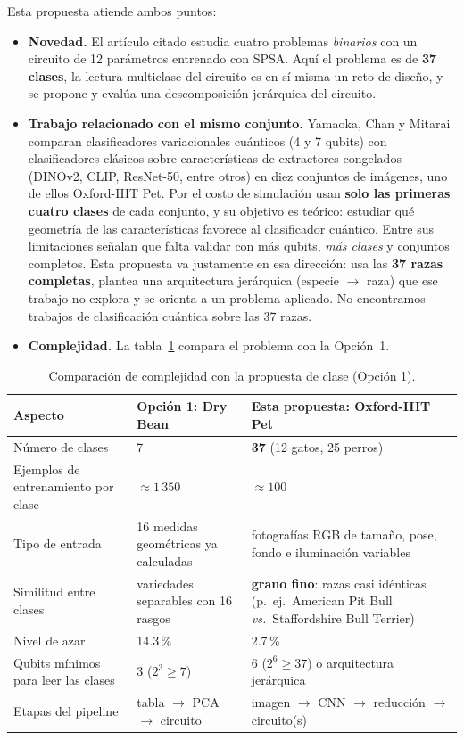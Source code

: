 \documentclass[11pt,letterpaper]{article}
\begin{document}
Esta propuesta atiende ambos puntos:
\begin{itemize}[leftmargin=*]
\item \textbf{Novedad.} El artículo citado estudia cuatro problemas \emph{binarios} con un circuito de
12 parámetros entrenado con SPSA. Aquí el problema es de \textbf{37 clases}, la lectura multiclase
del circuito es en sí misma un reto de diseño, y se propone y evalúa una descomposición jerárquica
del circuito.
\item \textbf{Trabajo relacionado con el mismo conjunto.} Yamaoka, Chan y Mitarai \cite{yamaoka2026}
comparan clasificadores variacionales cuánticos (4 y 7 qubits) con clasificadores clásicos sobre
características de extractores congelados (DINOv2, CLIP, ResNet-50, entre otros) en diez conjuntos de
imágenes, uno de ellos Oxford-IIIT Pet. Por el costo de simulación usan \textbf{solo las primeras
cuatro clases} de cada conjunto, y su objetivo es teórico: estudiar qué geometría de las
características favorece al clasificador cuántico. Entre sus limitaciones señalan que falta validar
con más qubits, \emph{más clases} y conjuntos completos. Esta propuesta va justamente en esa
dirección: usa las \textbf{37 razas completas}, plantea una arquitectura jerárquica (especie
$\to$ raza) que ese trabajo no explora y se orienta a un problema aplicado. No encontramos trabajos
de clasificación cuántica sobre las 37 razas.
\item \textbf{Complejidad.} La tabla~\ref{tab:complejidad} compara el problema con la Opción~1.
\end{itemize}

\begin{table}[H]
\centering\small
\caption{Comparación de complejidad con la propuesta de clase (Opción 1).}
\label{tab:complejidad}
\begin{tabular}{@{}p{5.2cm}p{4.2cm}p{5.4cm}@{}}
\toprule
Aspecto & Opción 1: Dry Bean & Esta propuesta: Oxford-IIIT Pet \\ \midrule
Número de clases & 7 & \textbf{37} (12 gatos, 25 perros) \\
Ejemplos de entrenamiento por clase & $\approx 1\,350$ & $\approx 100$ \\
Tipo de entrada & 16 medidas geométricas ya calculadas & fotografías RGB de tamaño, pose, fondo e iluminación variables \\
Similitud entre clases & variedades separables con 16 rasgos & \textbf{grano fino}: razas casi idénticas (p.\ ej.\ American Pit Bull \emph{vs.}\ Staffordshire Bull Terrier) \\
Nivel de azar & 14.3\,\% & 2.7\,\% \\
Qubits mínimos para leer las clases & 3 ($2^3\geq7$) & 6 ($2^6\geq37$) o arquitectura jerárquica \\
Etapas del pipeline & tabla $\to$ PCA $\to$ circuito & imagen $\to$ CNN $\to$ reducción $\to$ circuito(s) \\
\bottomrule
\end{tabular}
\end{table}
\end{document}
